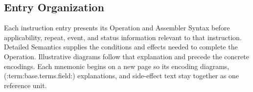 \subsection*{Entry Organization}
Each instruction entry presents its Operation and Assembler Syntax before applicability, repeat, event, and
status information relevant to that instruction. Detailed Semantics supplies the conditions and effects needed to
complete the Operation. Illustrative diagrams follow that explanation and precede the concrete encodings. Each mnemonic begins
on a new page so its encoding diagrams, (:term:base.terms.field:) explanations, and side-effect text stay together as one reference
unit.
